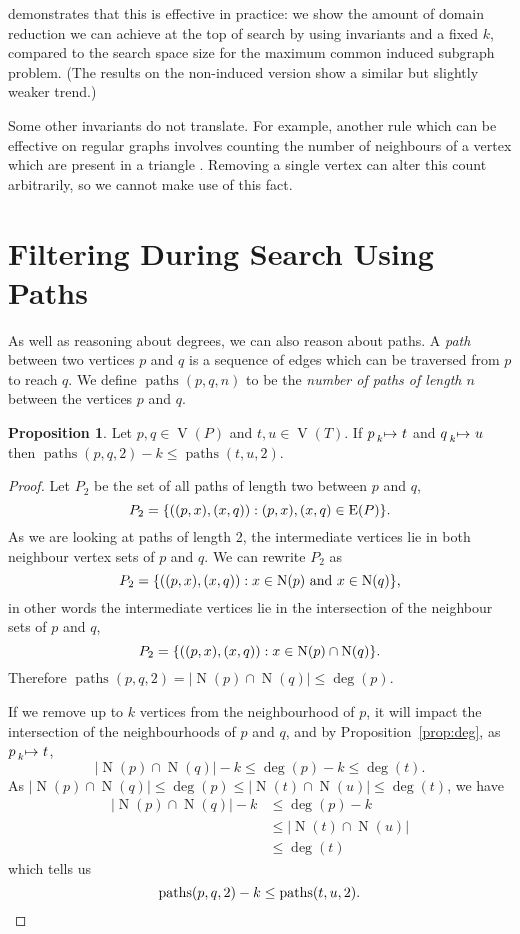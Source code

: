 \documentclass[letterpaper]{article}
\newcommand{\citep}[1]{\cite{#1}}
\theoremstyle{definition}
\newtheorem{proposition}{Proposition}
\newcommand{\paths}{\operatorname{paths}}
\newcommand{\lessmap}[1]{\prescript{}{#1}{\mapsto}\ }
\newcommand{\V}{\operatorname{V}}
\newcommand{\N}{\operatorname{N}}
\begin{document}
 demonstrates that this is effective in practice: we show the amount of domain
reduction we can achieve at the top of search by using invariants and a fixed $k$, compared to the
search space size for the maximum common induced subgraph problem. (The results on the non-induced
version show a similar but slightly weaker trend.)

Some other invariants do not translate. For example, another rule which can be effective on regular
graphs involves counting the number of neighbours of a vertex which are present in a triangle
\citep{mckay2014practical}. Removing a single vertex can alter this count arbitrarily, so we cannot
make use of this fact.

\section{Filtering During Search Using Paths}\label{section:pathfiltering}

As well as reasoning about degrees, we can also reason about paths.  A \emph{path} between two
vertices $p$ and $q$ is a sequence of edges which can be traversed from $p$ to reach $q$. We define
$\paths(p,q,n)$ to be the \emph{number of paths of length $n$} between the vertices $p$ and $q$.

\begin{proposition}\label{prop:paths}
    Let $p,q \in \V(P)$ and $t,u\in \V(T)$. If $p \lessmap{k} t$ and $q \lessmap{k} u$ then
     $\paths(p, q, 2) - k \le \paths(t, u, 2)$.
\end{proposition}
\begin{proof}
Let $P_{2}$ be the set of all paths of length two between $p$ and $q$, \[P_{2} = \{((p,x),(x,q)) :
(p,x),(x,q)\in \operatorname{E}(P) \}\textnormal{.}\] As we are looking at paths of length 2,
the intermediate vertices lie in both neighbour vertex sets of $p$ and $q$. We can rewrite
$P_{2}$ as \[P_{2} = \{((p,x),(x,q)) : x\in \N(p) \text{ and } x\in \N(q) \}\textnormal{,}\] in
other words the intermediate vertices lie in the intersection of the neighbour sets of $p$ and
$q$, \[ P_{2}=\{((p,x),(x,q)) : x\in \N(p)\cap \N(q) \} \textnormal{.}\] Therefore
$\paths(p,q,2) = \left| \N(p)\cap \N(q) \right|  \leq \deg(p)$.

If we remove up to $k$ vertices from the neighbourhood of $p$, it will impact the intersection of
    the neighbourhoods of $p$ and $q$, and by Proposition~\ref{prop:deg}, as $p\lessmap{k}t$,
\[
\left| \N(p)\cap \N(q)\right| - k \leq \deg(p) - k \leq \deg(t).
\]
As $\left|\N(p)\cap \N(q)\right|\leq \deg(p) \leq \left|\N(t)\cap \N(u)\right|\leq \deg(t)$, we have
\begin{align*}
\left|\N(p)\cap \N(q)\right| - k & \leq \deg(p) - k \\
 & \leq \left|\N(t)\cap \N(u)\right|\\
 & \leq \deg(t)
\end{align*}
which tells us
\[
\paths(p, q, 2) - k \leq \paths(t, u, 2). \qedhere
\]
\end{proof}
\end{document}
